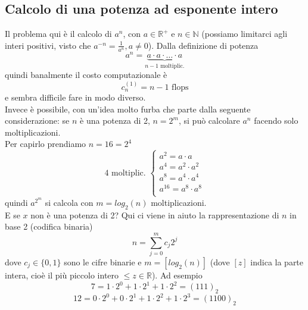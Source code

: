 \documentclass[12pt]{article}
\begin{document}
\subsection{Calcolo di una potenza ad esponente intero}
Il problema qui è il calcolo di $a^n$, con $a\in\mathbb{R}^+$ e $n\in \mathbb{N}$ (possiamo limitarci agli interi positivi, visto che $a^{-n}=\frac{1}{a^n}, a\neq0$). Dalla definizione di potenza
\[a^n = \underbrace{a\cdot a\cdot \dotsc \cdot a }_{n-1 \text{ moltiplic.}} \]
quindi banalmente il costo computazionale è
\[ c_n^{(1)}=n-1 \text{ flops}\]
e sembra difficile fare in modo diverso.\\
Invece è possibile, con un'idea molto furba che parte dalla seguente considerazione: se $n$ è una potenza di 2, $n=2^m$, si può calcolare $a^n$ facendo solo moltiplicazioni.\\
Per capirlo prendiamo $n=16=2^4$
\[ 4 \text{ moltiplic. }
\begin{cases}
    a^2 = a \cdot a \\
    a^4 = a^2 \cdot a^2 \\
    a^8 = a^4 \cdot a^4 \\
    a^{16} = a^8 \cdot a^8 \\
\end{cases}\]
quindi $a^{2^m}$ si calcola con $m=log_2(n)$ moltiplicazioni.\\
E se $x$ non è una potenza di 2? Qui ci viene in aiuto la rappresentazione di $n$ in base 2 (codifica binaria)
\[n=\sum_{j=0}^m c_j2^j\]
dove $c_j\in{\{0,1\}}$ sono le cifre binarie e $m=[log_2(n)]$ (dove $[z]$ indica la parte intera, cioè il più piccolo intero $\le z\in\mathbb{R}$). Ad esempio
\[7 = 1\cdot 2^0+1\cdot 2^1+1\cdot 2^2=(111)_2\]
\[12=0\cdot 2^0+0\cdot 2^1+1\cdot 2^2+1\cdot 2^3=(1100)_2\]
\end{document}
